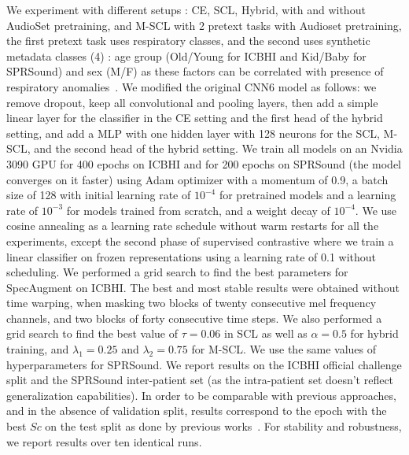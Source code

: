 \documentclass{article}
\begin{document}
\begin{sloppy}
We experiment with different setups : CE, SCL, Hybrid, with and without AudioSet pretraining, and M-SCL with 2 pretext tasks with Audioset pretraining, the first pretext task uses respiratory classes, and the second uses synthetic metadata classes (4) : age group (Old/Young for ICBHI and Kid/Baby for SPRSound) and sex (M/F) as these factors can be correlated with presence of respiratory anomalies~\cite{clhls}. We modified the original CNN6 model as follows: we remove dropout, keep all convolutional and pooling layers, then add a simple linear layer for the classifier in the CE setting and the first head of the hybrid setting, and add a MLP with one hidden layer with 128 neurons for the SCL, M-SCL, and the second head of the hybrid setting. We train all models on an Nvidia 3090 GPU for 400 epochs on ICBHI and for 200 epochs on SPRSound (the model converges on it faster) using Adam optimizer with a momentum of 0.9, a batch size of 128 with initial learning rate of $10^{-4}$ for pretrained models and a learning rate of $10^{-3}$ for models trained from scratch, and a weight decay of $10^{-4}$. We use cosine annealing as a learning rate schedule without warm restarts for all the experiments, except the second phase of supervised contrastive where we train a linear classifier on frozen representations using a learning rate of 0.1 without scheduling.
We performed a grid search to find the best parameters for SpecAugment on ICBHI. The best and most stable results were obtained without time warping, when masking two blocks of twenty consecutive mel frequency channels, and two blocks of forty consecutive time steps. We also performed a grid search to find the best value of $\tau=0.06$ in SCL as well as $\alpha=0.5$ for hybrid training, and $\lambda_{1}=0.25$ and $\lambda_{2}=0.75$ for M-SCL. We use the same values of hyperparameters for SPRSound. We report results on the ICBHI official challenge split and the SPRSound inter-patient set (as the intra-patient set doesn't reflect generalization capabilities). In order to be comparable with previous approaches, and in the absence of validation split, results correspond to the epoch with the best $Sc$ on the test split as done by previous works~\cite{gairola2020respirenet}. For stability and robustness, we report results over ten identical runs.


\end{sloppy}
\end{document}
